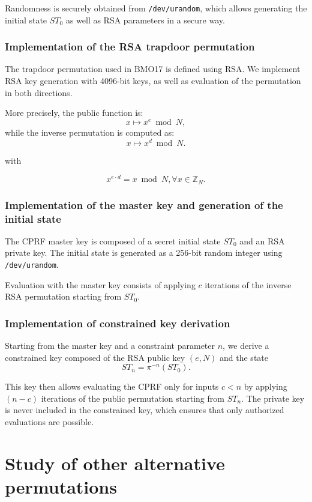\documentclass[9pt]{extarticle}
\begin{document}
Randomness is securely obtained from \texttt{/dev/urandom}, which
allows generating the initial state $ST_0$ as well as RSA parameters in a secure way.

\subsubsection{Implementation of the RSA trapdoor permutation}

The trapdoor permutation used in BMO17 is defined using RSA.
We implement RSA key generation with 4096-bit keys, as well as evaluation
of the permutation in both directions.

More precisely, the public function is:
\[
x \mapsto x^e \bmod N,
\]
while the inverse permutation is computed as:
\[
x \mapsto x^d \bmod N.
\]

with

\[
x^{e \cdot d} = x \bmod N , \forall x \in \mathbb{Z}_N.
\]

\subsubsection{Implementation of the master key and generation of the initial state}

The CPRF master key is composed of a secret initial state $ST_0$ and an RSA private key.
The initial state is generated as a 256-bit random integer using
\texttt{/dev/urandom}.

Evaluation with the master key consists of applying $c$ iterations of the inverse RSA permutation
starting from $ST_0$.

\subsubsection{Implementation of constrained key derivation}

Starting from the master key and a constraint parameter $n$, we derive a constrained key
composed of the RSA public key $(e, N)$ and the state
\[
ST_n = \pi^{-n}(ST_0).
\]

This key then allows evaluating the CPRF only for inputs $c < n$ by applying $(n-c)$
iterations of the public permutation starting from $ST_n$. The private key is never included
in the constrained key, which ensures that only authorized evaluations are possible.

\section{Study of other alternative permutations}
\end{document}

